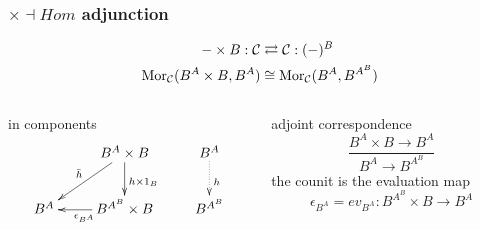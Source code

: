 \begin{frame}[t]
\frametitle{$\times \dashv Hom$ adjunction}
\begin{block}{}
\abovedisplayskip=0pt
\begin{align*}
- \times B: \mathcal{C} & \rightleftarrows \mathcal{C}: (-)^B\\
\mathop{\rm Mor}\nolimits_{\mathcal{C}}(B^A \times B, B^A) & \cong  \mathop{\rm Mor}\nolimits_{\mathcal{C}}(B^A, B^{A^B})
\end{align*}
\end{block}
\begin{columns}[t]
    \begin{column}{0.5\textwidth}
\begin{block}{in components}
			$$
			\xymatrix{
			& B^A \times B \ar[d]^{h \times 1_B} \ar[dl]_{\bar{h}} & B^A \ar@{.>}[d]^{h}\\
			B^A & B^{A^B} \times B \ar[l]^{\epsilon_{B^A}} & B^{A^B}}
			$$
		\end{block}
    \end{column}
    \begin{column}{0.5\textwidth}
		\begin{block}{adjoint correspondence}
		\abovedisplayskip=0pt
		$$
			\frac{B^A \times B \longrightarrow B^A}{B^A \longrightarrow B^{A^B}}
		$$
		the counit is the evaluation map
		$$
			\epsilon_{B^A} = ev_{B^A} \colon B^{A^B} \times B \longrightarrow B^A
		$$
		\end{block}		
    \end{column}
\end{columns}
\end{frame}